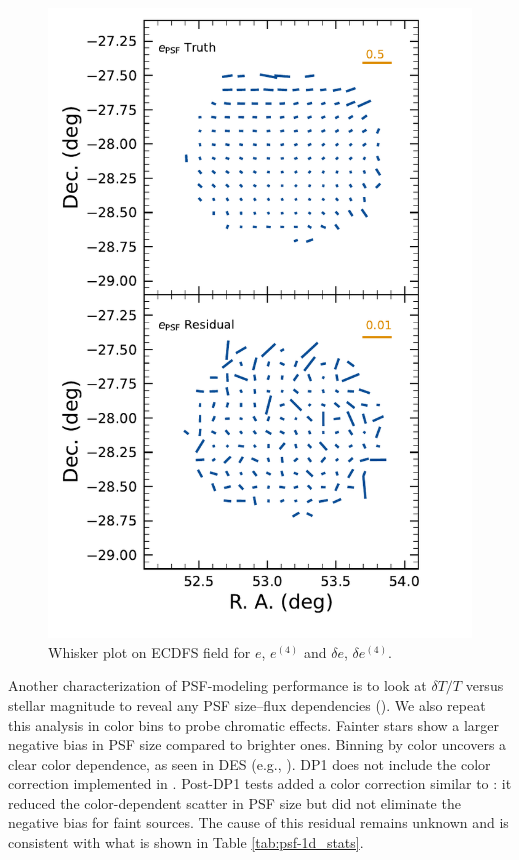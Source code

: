 \begin{figure}[htb!]
    \includegraphics[scale=0.33]{figures/performance/psf_second_whisker.pdf}
    \caption{\small Whisker plot on ECDFS field for $e$, $e^{(4)}$ and $\delta e$, $\delta e^{(4)}$.}
    \label{fig:psf_residuals_whisker_ECDFS}
\end{figure}

Another characterization of PSF-modeling performance is to look at $\delta T/T$ versus stellar magnitude to reveal any PSF size–flux dependencies (). We also repeat this analysis in color bins to probe chromatic effects. Fainter stars show a larger negative bias in PSF size 
compared to brighter ones. Binning by color uncovers a clear color dependence, as seen in \gls{DES} (e.g., \citealt{DES:2020vau}). DP1 does not include the color correction implemented in \cite{2025OJAp....8E..26S}. 
Post-DP1 tests added a color correction similar to \cite{2025OJAp....8E..26S}: it reduced the color-dependent scatter in PSF size but did not eliminate the negative bias for faint sources. 
The cause of this residual remains unknown and is consistent with what is shown in Table \ref{tab:psf-1d_stats}.

